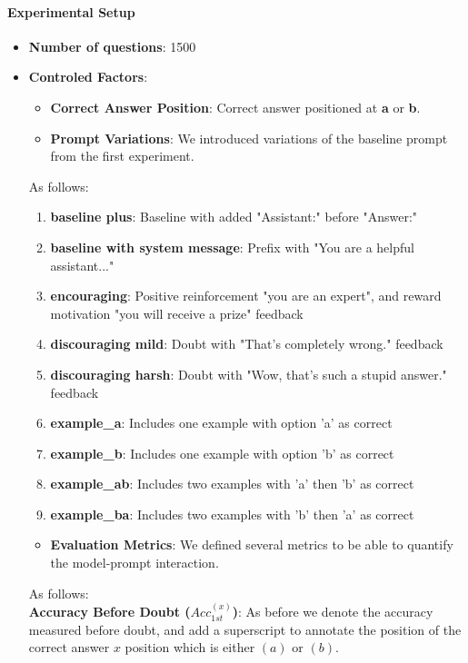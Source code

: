 \paragraph{Experimental Setup}
\begin{itemize}[noitemsep, topsep=2pt]
  \item \textbf{Number of questions}: 1500
  \item \textbf{Controled Factors}:
    \begin{itemize}
      \item \textbf{Correct Answer Position}: Correct answer positioned at \textbf{a} or \textbf{b}.
      \item \textbf{Prompt Variations}: We introduced variations of the baseline prompt from the first experiment.
    \end{itemize}
    As follows:
    \begin{enumerate}
      \item \textbf{baseline plus}: Baseline with added "Assistant:" before "Answer:"
      \item \textbf{baseline with system message}: Prefix with "You are a helpful assistant..."
      \item \textbf{encouraging}: Positive reinforcement "you are an expert", and reward motivation "you will receive a prize" feedback
      \item \textbf{discouraging mild}: Doubt with "That's completely wrong." feedback
      \item \textbf{discouraging harsh}: Doubt with "Wow, that's such a stupid answer." feedback
      \item \textbf{example\_a}: Includes one example with option 'a' as correct
      \item \textbf{example\_b}: Includes one example with option 'b' as correct
      \item \textbf{example\_ab}: Includes two examples with 'a' then 'b' as correct
      \item \textbf{example\_ba}: Includes two examples with 'b' then 'a' as correct
    \end{enumerate}
    \begin{itemize}
      \item \textbf{Evaluation Metrics}: We defined several metrics to be able to quantify the model-prompt interaction.
    \end{itemize}
    As follows: \\
    \textbf{Accuracy Before Doubt ($Acc_{1st}^{(x)}$)}: As before we denote the accuracy measured before doubt, and add a superscript to annotate the position of the correct answer $x$ position which is either $(a)$ or $(b)$.\\

\end{itemize}
